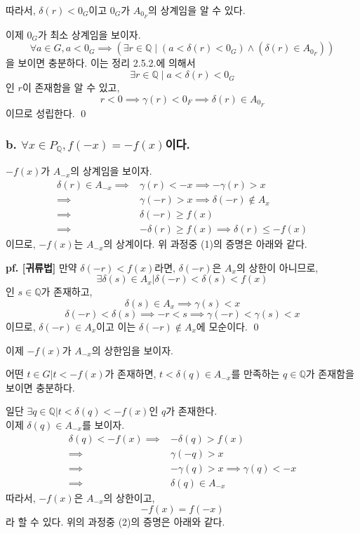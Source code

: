 \documentclass{article}
\begin{document}
따라서, $\delta(r) < 0_G$이고 $0_G$가 $A_{0_F}$의 상계임을 알 수 있다.

이제 $0_G$가 최소 상계임을 보이자. 
$$\forall a \in G,  a < 0_G \implies (\exists r \in \mathbb{Q}\mid ( a < \delta(r) < 0_G) \wedge (\delta(r) \in A_{0_F}) )$$을 보이면 충분하다. 이는 정리 2.5.2.에 의해서 
$$\exists r \in \mathbb{Q} \mid a < \delta(r) < 0_G$$인 $r$이 존재함을 알 수 있고, 
$$r < 0 \implies \gamma(r) < 0_F \implies \delta(r) \in A_{0_F}$$이므로 성립한다. \qed

\subsubsection{b. $\forall x \in P_\mathbb{Q},  f(-x) = -f(x)$이다.}
$-f(x)$가 $A_{-x}$의 상계임을 보이자.
\begin{align*}
\delta(r) \in A_{-x} \implies& \gamma(r) < -x \implies -\gamma(r) > x\\
\implies& \gamma(-r) > x \implies \delta(-r) \notin A_x\\
\implies& \delta(-r) \ge f(x) \tag{1}\\
\implies& -\delta(r) \ge f(x) \implies \delta(r) \le -f(x)
\end{align*}
이므로, $-f(x)$는 $A_{-x}$의 상계이다. 위 과정중 (1)의 증명은 아래와 같다.

\textbf{pf. [귀류법]} 만약 $\delta(-r) < f(x)$라면, $\delta(-r)$은 $A_x$의 상한이 아니므로,
$$ \exists \delta(s) \in A_x \bigg| \delta(-r) < \delta(s) < f(x)$$
인 $s \in \mathbb{Q}$가 존재하고,
$$\delta(s) \in A_x \implies \gamma(s) < x$$
$$\delta(-r) < \delta(s) \implies -r < s \implies \gamma(-r) < \gamma(s) < x$$
이므로, $\delta(-r) \in A_x$이고 이는 $ \delta(-r) \notin A_x$에 모순이다. \qed

이제 $-f(x)$가 $A_{-x}$의 상한임을 보이자. 

어떤 $t \in G \bigg| t < -f(x)$가 존재하면, $t < \delta(q) \in A_{-x}$를 만족하는 $q \in \mathbb{Q}$가 존재함을 보이면 충분하다.

일단 $\exists q \in \mathbb{Q} \bigg| t < \delta(q) < -f(x)$인 $q$가 존재한다.\\
 이제 $\delta(q) \in A_{-x}$를 보이자.
\begin{align*}
\delta(q) < -f(x) \implies& -\delta(q) > f(x) \\
\implies& \gamma(-q) > x \tag{2}\\
\implies& -\gamma(q) > x \implies \gamma(q) < -x \\
\implies& \delta(q) \in A_{-x}
\end{align*}
따라서, $-f(x)$은 $A_{-x}$의 상한이고, 
$$-f(x) = f(-x)$$라 할 수 있다. 위의 과정중 (2)의 증명은 아래와 같다.
\end{document}
